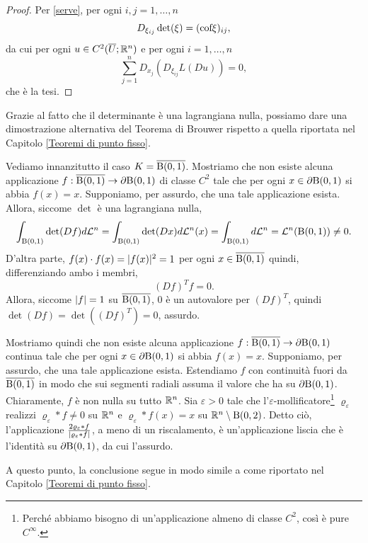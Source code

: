 \begin{proof}
	Per \eqref{serve}, per ogni $i,j = 1,\dots,n$
	\[ D_{ \xi_{ij}} \det (\xi) = (\textup{cof}\xi)_{ij}, \]
	da cui per ogni $u \in C^2(\overline{U};\mathbb{R}^n)$ e per ogni $i =1,\dots,n$
	\[ \sum_{j=1}^n D_{x_j}\left( D_{\xi_{ij}}L(Du)\right) =0, \]
	che è la tesi.
\end{proof}
\begin{osservazione}
	Grazie al fatto che il determinante è una lagrangiana nulla, possiamo dare una dimostrazione alternativa del Teorema di Brouwer rispetto a quella riportata nel Capitolo \ref{Teoremi di punto fisso}. 
	
	Vediamo innanzitutto il caso $K = \overline{\textup{B}(0,1)}$. Mostriamo che non esiste alcuna applicazione $f: \overline{\textup{B}(0,1)} \to \partial \textup{B}(0,1)$ di classe $C^2$ tale che per ogni $x \in \partial \textup{B}(0,1)$ si abbia $f(x) = x$. Supponiamo, per assurdo, che una tale applicazione esista. Allora, siccome $\det$ è una lagrangiana nulla,
	\[ \int_{\textup{B}(0,1)} \det(Df) d\mathcal{L}^n = \int_{\textup{B}(0,1)} \det(Dx)d\mathcal{L}^n(x) = \int_{\textup{B}(0,1)}d\mathcal{L}^n = \mathcal{L}^n(\textup{B}(0,1)) \ne 0.\]
	D'altra parte, $f(x) \cdot f(x) = \lvert f(x)\rvert^2 = 1$ per ogni $x \in \overline{\textup{B}(0,1)}$ quindi, differenziando ambo i membri,
	\[ (Df)^T f = 0. \]
	Allora, siccome $\lvert f\rvert = 1$ su $\overline{\textup{B}(0,1)}$, $0$ è un autovalore per $(Df)^T$, quindi $\det(Df) = \det((Df)^T) = 0$, assurdo.
	
	Mostriamo quindi che non esiste alcuna applicazione $f: \overline{\textup{B}(0,1)} \to \partial \textup{B}(0,1)$ continua tale che per ogni $x \in \partial \textup{B}(0,1)$ si abbia $f(x) = x$. Supponiamo, per assurdo, che una tale applicazione esista. Estendiamo $f$ con continuità fuori da $ \overline{\textup{B}(0,1)}$ in modo che sui segmenti radiali assuma il valore che ha su $\partial \textup{B}(0,1)$. Chiaramente, $f$ è non nulla su tutto $\mathbb{R}^n$. Sia $\varepsilon >0$ tale che l'$\varepsilon$-mollificatore\footnote{Perché abbiamo bisogno di un'applicazione almeno di classe $C^2$, così è pure $C^\infty$.} $\varrho_\varepsilon$ realizzi $ \varrho_\varepsilon \ast f \ne 0$ su $\mathbb{R}^n$ e $\varrho_\varepsilon \ast f(x) = x$ su $\mathbb{R}^n\setminus{\textup{B}(0,2)}$. Detto ciò, l'applicazione $\frac{2\varrho_\varepsilon \ast f}{\lvert\varrho_\varepsilon \ast f\rvert}$, a meno di un riscalamento, è un'applicazione liscia che è l'identità su $\partial \textup{B}(0,1)$, da cui l'assurdo.
	
	A questo punto, la conclusione segue in modo simile a come riportato nel Capitolo \ref{Teoremi di punto fisso}.
\end{osservazione}

